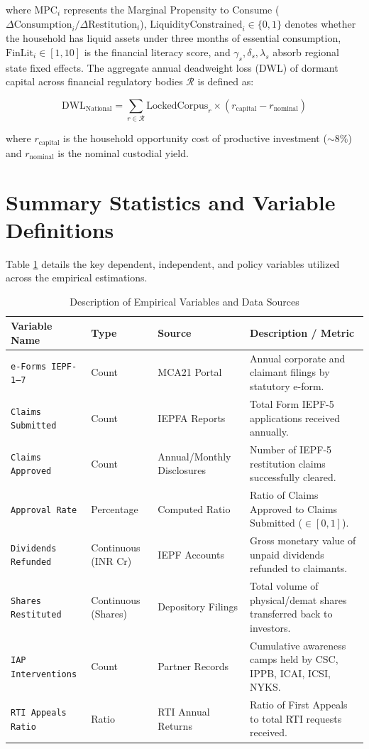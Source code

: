 \documentclass[openany]{book}
\begin{document}
where $\text{MPC}_i$ represents the Marginal Propensity to Consume ($\Delta \text{Consumption}_i / \Delta \text{Restitution}_i$), $\text{LiquidityConstrained}_i \in \{0, 1\}$ denotes whether the household has liquid assets under three months of essential consumption, $\text{FinLit}_i \in [1, 10]$ is the financial literacy score, and $\gamma_s, \delta_s, \lambda_s$ absorb regional state fixed effects. The aggregate annual deadweight loss ($\text{DWL}$) of dormant capital across financial regulatory bodies $\mathcal{R}$ is defined as:

\begin{equation}
\text{DWL}_{\text{National}} = \sum_{r \in \mathcal{R}} \text{LockedCorpus}_r \times \left( r_{\text{capital}} - r_{\text{nominal}} \right)
\label{eq:dwl_model}
\end{equation}

where $r_{\text{capital}}$ is the household opportunity cost of productive investment ($\sim 8\%$) and $r_{\text{nominal}}$ is the nominal custodial yield.

\section{Summary Statistics and Variable Definitions}
Table \ref{tab:variables_summary} details the key dependent, independent, and policy variables utilized across the empirical estimations.

\begin{table}[H]
\centering
\small
\begin{tabular}{|p{3.5cm}|p{2cm}|p{3cm}|p{6.5cm}|}
\hline
\textbf{Variable Name} & \textbf{Type} & \textbf{Source} & \textbf{Description / Metric} \\ \hline
\texttt{e-Forms IEPF-1--7} & Count & MCA21 Portal & Annual corporate and claimant filings by statutory e-form. \\ \hline
\texttt{Claims Submitted} & Count & IEPFA Reports & Total Form IEPF-5 applications received annually. \\ \hline
\texttt{Claims Approved} & Count & Annual/Monthly Disclosures & Number of IEPF-5 restitution claims successfully cleared. \\ \hline
\texttt{Approval Rate} & Percentage & Computed Ratio & Ratio of Claims Approved to Claims Submitted ($\in [0, 1]$). \\ \hline
\texttt{Dividends Refunded} & Continuous (INR Cr) & IEPF Accounts & Gross monetary value of unpaid dividends refunded to claimants. \\ \hline
\texttt{Shares Restituted} & Continuous (Shares) & Depository Filings & Total volume of physical/demat shares transferred back to investors. \\ \hline
\texttt{IAP Interventions} & Count & Partner Records & Cumulative awareness camps held by CSC, IPPB, ICAI, ICSI, NYKS. \\ \hline
\texttt{RTI Appeals Ratio} & Ratio & RTI Annual Returns & Ratio of First Appeals to total RTI requests received. \\ \hline
\end{tabular}
\caption{Description of Empirical Variables and Data Sources}
\label{tab:variables_summary}
\end{table}
\end{document}

